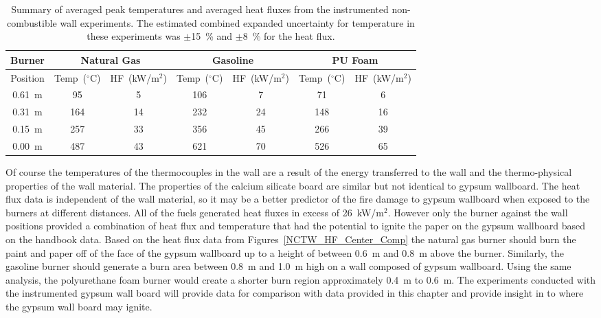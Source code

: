 \documentclass[twoside]{uocthesis}
\begin{document}
{\begin{table}
	\centering
	\footnotesize
	\begin{tabular}{|c|c|c|c|c|c|c|}
		\hline {Burner} & \multicolumn{2}{c}{Natural Gas} & \multicolumn{2}{c}{Gasoline} & \multicolumn{2}{c|}{PU Foam} \\
		\hline  Position & Temp~($^\circ$C) & HF~(kW/m$^{2}$) & Temp~($^\circ$C) & HF~(kW/m$^{2}$) & Temp~($^\circ$C) & HF~(kW/m$^{2}$) 	\\
		\hline 0.61~m & 95 & 5 & 106 & 7 & 71 & 6 \\
		\hline 0.31~m & 164 & 14 & 232 & 24 & 148 & 16	\\
		\hline 0.15~m & 257 & 33 & 356 & 45 & 266 & 39	\\
		\hline 0.00~m & 487 & 43 & 621 & 70 & 526 & 65 	\\
		\hline
	\end{tabular}
	\caption[Summary of instrumented non-combustible wall experiments]{Summary of averaged peak temperatures and averaged heat fluxes from the instrumented non-combustible wall experiments.  The estimated combined expanded uncertainty for temperature in these experiments was $\pm$15~\% and $\pm$8~\% for the heat flux.}
	\label{tab:TW_Summary}
\end{table}


Of course the temperatures of the thermocouples in the wall are a result of the energy transferred to the wall and the thermo-physical properties of the wall material. The properties of the calcium silicate board are similar but not identical to gypsum wallboard.  The heat flux data is independent of the wall material, so it may be a better predictor of the fire damage to gypsum wallboard when exposed to the burners at different distances.    All of the fuels generated heat fluxes in excess of 26~kW/m$^2$.  However only the burner against the wall positions provided a combination of heat flux and temperature that had the potential to ignite the paper on the gypsum wallboard based on the handbook data.  Based on the heat flux data from Figures~\ref{NCTW_HF_Center_Comp} the natural gas burner should burn the paint and paper off of the face of the gypsum wallboard up to a height of between 0.6~m and 0.8~m above the burner.  Similarly, the gasoline burner should generate a burn area between 0.8~m and 1.0~m high on a wall composed of gypsum wallboard.  Using the same analysis, the polyurethane foam burner would create a shorter burn region approximately 0.4~m to 0.6~m.  The experiments conducted with the instrumented gypsum wall board will provide data for comparison with data provided in this chapter and provide insight in to where the gypsum wall board may ignite. 


}
\end{document}
